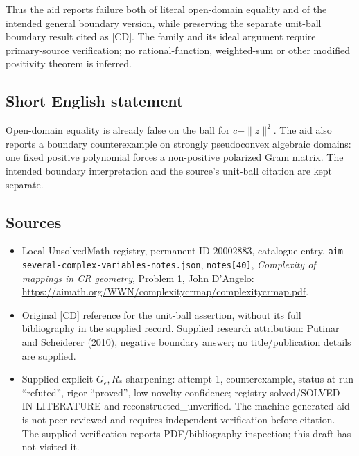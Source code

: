 \documentclass[11pt]{article}
\begin{document}
Thus the aid reports failure both of literal open-domain equality and of the intended general boundary version, while preserving the separate unit-ball boundary result cited as [CD]. The family and its ideal argument require primary-source verification; no rational-function, weighted-sum or other modified positivity theorem is inferred.
\subsection{Short English statement}
Open-domain equality is already false on the ball for \(c-\|z\|^2\). The aid also reports a boundary counterexample on strongly pseudoconvex algebraic domains: one fixed positive polynomial forces a non-positive polarized Gram matrix. The intended boundary interpretation and the source's unit-ball citation are kept separate.
\subsection{Sources}
\begin{itemize}
\item Local UnsolvedMath registry, permanent ID \(20002883\), catalogue entry, \texttt{aim-several-complex-variables-notes.json}, \texttt{notes[40]}, \emph{Complexity of mappings in CR geometry}, Problem 1, John D'Angelo: \url{https://aimath.org/WWN/complexitycrmap/complexitycrmap.pdf}.
\item Original [CD] reference for the unit-ball assertion, without its full bibliography in the supplied record. Supplied research attribution: Putinar and Scheiderer (2010), negative boundary answer; no title/publication details are supplied.
\item Supplied explicit \(G_\epsilon,R_*\) sharpening: attempt 1, counterexample, status at run ``refuted'', rigor ``proved'', low novelty confidence; registry solved/SOLVED-IN-LITERATURE and reconstructed\_unverified. The machine-generated aid is not peer reviewed and requires independent verification before citation. The supplied verification reports PDF/bibliography inspection; this draft has not visited it.
\end{itemize}
\end{document}
